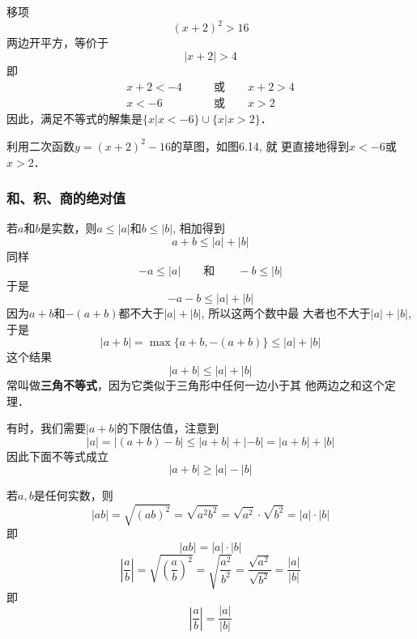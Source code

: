 \begin{solution}
    移项
\[(x+2)^2>16\]
    两边开平方，等价于
    \[|x+2|>4\]
    即
    \[\begin{split}
        x+2<-4\qquad &\text{或}\qquad x+2>4\\  x<-6\qquad &\text{或}\qquad x>2
    \end{split}\]
因此，满足不等式的解集是$\{x|x<-6\}\cup\{x|x>2\}$．

利用二次函数$y=(x+2)^2-16$的草图，如图6.14, 就
更直接地得到$x<-6$或$x>2$．
\begin{figure}[htp]
    \centering
{}

    \caption{}
\end{figure}
\end{solution}

\subsubsection{和、积、商的绝对值}
若$a$和$b$是实数，则$a\le |a|$和$b\le |b|$, 相加得到
\[a+b\le  |a|+|b|\]
同样
\[-a\le |a|\qquad \text{和}\qquad -b\le |b|\]
于是
\[-a-b\le |a|+|b|\]
因为$a+b$和$-(a+b)$都不大于$|a|+|b|$, 所以这两个数中最
大者也不大于$|a|+|b|$, 于是
\[|a+b|=\max\{a+b,-(a+b)\}\le |a|+|b|\]
这个结果
\begin{equation}
    |a+b|\le |a|+|b|
\end{equation}
常叫做\textbf{三角不等式}，因为它类似于三角形中任何一边小于其
他两边之和这个定理．

有时，我们需要$|a+b|$的下限估值，注意到
\[|a|=|(a+b)-b|\le |a+b| +|-b| =|a+b| +|b|\]
因此下面不等式成立
\begin{equation}
    |a+b|\ge |a|-|b|
\end{equation}

若$a,b$是任何实数，则
\[|ab|=\sqrt{(ab)^2}=\sqrt{a^2b^2}=\sqrt{a^2}\cdot \sqrt{b^2}=|a|\cdot |b|\]
即
\begin{equation}
    |ab|=|a|\cdot |b|
\end{equation}
\[\left|\frac{a}{b}\right|=\sqrt{\left(\frac{a}{b}\right)^2}=\sqrt{\frac{a^2}{b^2}}=\frac{\sqrt{a^2}}{\sqrt{b^2}}=\frac{|a|}{|b|}\]
即
\begin{equation}
    \left|\frac{a}{b}\right|=\frac{|a|}{|b|}
\end{equation}

